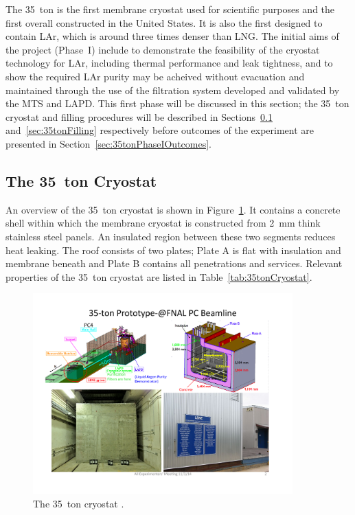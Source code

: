The 35~ton is the first membrane cryostat used for scientific purposes and the first overall constructed in the United States.  It is also the first designed to contain LAr, which is around three times denser than LNG.  The initial aims of the project (Phase~I) include to demonstrate the feasibility of the cryostat technology for LAr, including thermal performance and leak tightness, and to show the required LAr purity may be acheived without evacuation and maintained through the use of the filtration system developed and validated by the MTS and LAPD.  This first phase will be discussed in this section; the 35~ton cryostat and filling procedures will be described in Sections~\ref{sec:35tonCryostat} and~\ref{sec:35tonFilling} respectively before outcomes of the experiment are presented in Section~\ref{sec:35tonPhaseIOutcomes}.

\subsection{The 35~ton Cryostat}\label{sec:35tonCryostat}

An overview of the 35~ton cryostat is shown in Figure~\ref{fig:35tonCryostat}.  It contains a concrete shell within which the membrane cryostat is constructed from 2~mm think stainless steel panels.  An insulated region between these two segments reduces heat leaking.  The roof consists of two plates; Plate A is flat with insulation and membrane beneath and Plate B contains all penetrations and services.  Relevant properties of the 35~ton cryostat are listed in Table~\ref{tab:35tonCryostat}.

\begin{figure}
  \centering
  \includegraphics[width=10cm]{35tonCryostat.pdf}
  \caption[The 35~ton cryostat.]{The 35~ton cryostat \cite{35tonPhaseI2015}.}
  \label{fig:35tonCryostat}
\end{figure}

